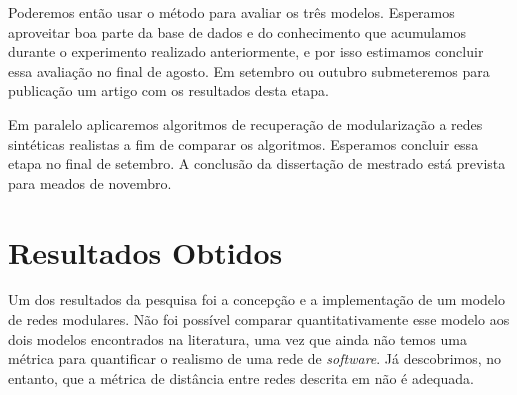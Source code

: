\documentclass[12pt]{article}
\begin{document}
Poderemos então usar o método para avaliar os três modelos. Esperamos aproveitar
boa parte da base de dados e do conhecimento que acumulamos durante o
experimento realizado anteriormente, e por isso estimamos concluir essa
avaliação no final de agosto. Em setembro ou outubro submeteremos para
publicação um artigo com os resultados desta etapa.

Em paralelo aplicaremos algoritmos de recuperação de modularização a redes
sintéticas realistas a fim de comparar os algoritmos. Esperamos concluir essa
etapa no final de setembro. A conclusão da dissertação de mestrado está prevista
para meados de novembro.

%

\section{Resultados Obtidos}

Um dos resultados da pesquisa foi a concepção e a implementação de um modelo de
redes modulares. Não foi possível comparar quantitativamente esse modelo aos
dois modelos encontrados na literatura, uma vez que ainda não temos uma métrica
para quantificar o realismo de uma rede de \emph{software}. Já descobrimos, no
entanto, que a métrica de distância entre redes descrita em \cite{Andrade2008}
não é adequada.
\end{document}
